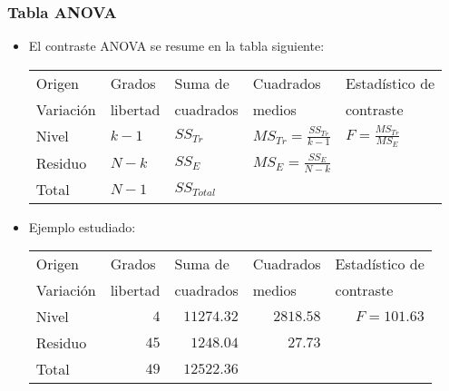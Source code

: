 \begin{frame}
\frametitle{Tabla ANOVA}
\begin{itemize}
\item<2-> El contraste ANOVA se resume en la tabla siguiente:
{\small \begin{center}
\begin{tabular}{ll@{}@{}l@{}@{}l@{}l}
\hline
Origen&Grados&Suma de&Cuadrados&Estadístico de\\
Variación&libertad&\multicolumn{1}{c}{cuadrados}&medios&contraste\\\hline
Nivel&$k-1$&$SS_{Tr}$&$MS_{Tr}=\frac{SS_{Tr}}{k-1}$&$F=\frac{MS_{Tr}}{MS_E}$\\
Residuo&$N-k$&$SS_E$&$MS_E=\frac{SS_E}{N-k}$&\\\hline
Total&$N-1$&$SS_{Total}$&&\\\hline
\end{tabular}
\end{center}}
\item<3-> Ejemplo estudiado:
{\small \begin{center}
\begin{tabular}{rr@{}@{}r@{}@{}rr}
\hline
\multicolumn{1}{l}{Origen}&\multicolumn{1}{l}{Grados}&\multicolumn{1}{l}{Suma de}&\multicolumn{1}{l}{Cuadrados}&\multicolumn{1}{l}{Estadístico de}\\
\multicolumn{1}{l}{Variación}&\multicolumn{1}{l}{libertad}&\multicolumn{1}{c}{cuadrados}&\multicolumn{1}{l}{medios}&\multicolumn{1}{l}{contraste}\\\hline
\multicolumn{1}{l}{Nivel}&$4$&$11274.32$&$2818.58$&$F= 101.63$\\
\multicolumn{1}{l}{Residuo}&$45$&$1248.04$&$27.73$&\\\hline
\multicolumn{1}{l}{Total}&$49$&$12522.36$&&\\\hline
\end{tabular}
\end{center}}
\end{itemize}
\end{frame}

